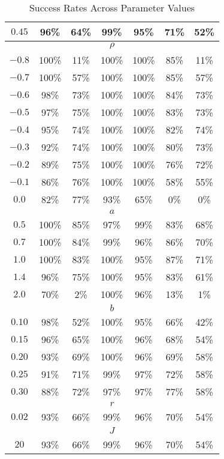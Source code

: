 \begin{table}[h!]
\begin{tabular}{c|cccccc}
    $0.45$ & 96\% & 64\% & 99\% & 95\% & 71\% & 52\% \\
    \midrule
    \multicolumn{7}{c}{$\rho$} \\
    $-0.8$ & 100\% & 11\% & 100\% & 100\% & 85\% & 11\% \\
    $-0.7$ & 100\% & 57\% & 100\% & 100\% & 85\% & 57\% \\
    $-0.6$ & 98\% & 73\% & 100\% & 100\% & 84\% & 73\% \\
    $-0.5$ & 97\% & 75\% & 100\% & 100\% & 83\% & 73\% \\
    $-0.4$ & 95\% & 74\% & 100\% & 100\% & 82\% & 74\% \\
    $-0.3$ & 92\% & 74\% & 100\% & 100\% & 80\% & 73\% \\
    $-0.2$ & 89\% & 75\% & 100\% & 100\% & 76\% & 72\% \\
    $-0.1$ & 86\% & 76\% & 100\% & 100\% & 58\% & 55\% \\
    $0.0$  & 82\% & 77\% & 93\% & 65\% & 0\%  & 0\% \\
    \midrule
    \multicolumn{7}{c}{$a$} \\
    $0.5$ & 100\% & 85\% & 97\% & 99\% & 83\% & 68\% \\
    $0.7$ & 100\% & 84\% & 99\% & 96\% & 86\% & 70\% \\
    $1.0$ & 100\% & 83\% & 100\% & 95\% & 87\% & 71\% \\
    $1.4$ & 96\%  & 75\% & 100\% & 95\% & 83\% & 61\% \\
    $2.0$ & 70\%  & 2\%  & 100\% & 96\% & 13\% & 1\% \\
    \midrule
    \multicolumn{7}{c}{$b$} \\
    $0.10$ & 98\% & 52\% & 100\% & 95\% & 66\% & 42\% \\
    $0.15$ & 96\% & 65\% & 100\% & 96\% & 68\% & 54\% \\
    $0.20$ & 93\% & 69\% & 100\% & 96\% & 69\% & 58\% \\
    $0.25$ & 91\% & 71\% & 99\%  & 97\% & 72\% & 58\% \\
    $0.30$ & 88\% & 72\% & 97\%  & 97\% & 77\% & 58\% \\
    \midrule
    \multicolumn{7}{c}{$r$} \\
    $0.02$ & 93\% & 66\% & 99\% & 96\% & 70\% & 54\% \\
    \midrule
    \multicolumn{7}{c}{$J$} \\
    $20$ & 93\% & 66\% & 99\% & 96\% & 70\% & 54\% \\
    \bottomrule
    \end{tabular}
    \caption{Success Rates Across Parameter Values}
\end{table}


